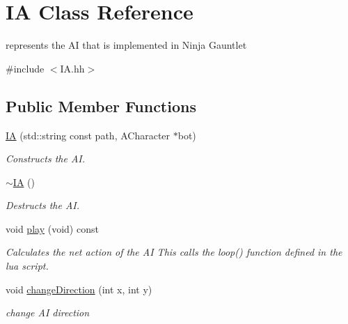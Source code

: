 \hypertarget{classIA}{}\section{IA Class Reference}
\label{classIA}


represents the AI that is implemented in Ninja Gauntlet  




{\ttfamily \#include $<$I\+A.\+hh$>$}

\subsection*{Public Member Functions}
\begin{DoxyCompactItemize}
\item 
\hyperlink{classIA_a0733aa0c9dd00b142f8b474fc3b0b714}{IA} (std\+::string const path, A\+Character $\ast$bot)
\begin{DoxyCompactList}\small\item\em Constructs the AI. \end{DoxyCompactList}\item 
\mbox{\label{classIA_a67d4dd285ae5169239348432bab9ad0e}} 
\hyperlink{classIA_a67d4dd285ae5169239348432bab9ad0e}{$\sim$\+IA} ()
\begin{DoxyCompactList}\small\item\em Destructs the AI. \end{DoxyCompactList}\item 
\mbox{\label{classIA_a81df51f46b3b30ff6bece457d094b3fc}} 
void \hyperlink{classIA_a81df51f46b3b30ff6bece457d094b3fc}{play} (void) const
\begin{DoxyCompactList}\small\item\em Calculates the net action of the AI This calls the loop() function defined in the lua script. \end{DoxyCompactList}\item 
void \hyperlink{classIA_ac2e4429cbb6cfba8c5f1b99d04275ce5}{change\+Direction} (int x, int y)
\begin{DoxyCompactList}\small\item\em change AI direction \end{DoxyCompactList}\end{DoxyCompactItemize}
